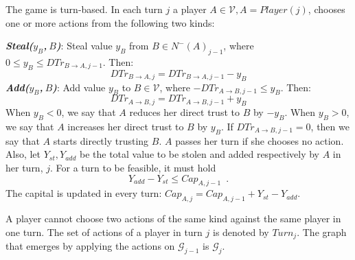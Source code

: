 \begin{definition}[Turns]
  The game is turn-based. In each turn $j$ a player $A \in \mathcal{V}, A =
  Player\left(j\right)$, chooses one or more actions from the following two kinds:

  \noindent \textit{\textbf{Steal($y_B$,$\:B$)}}: Steal value $y_B$ from $B \in N^{-}\left(A\right)_{j-1}$, where
  $0 \leq y_B \leq DTr_{B \rightarrow A, j-1}$. Then:
  \begin{equation*}
     DTr_{B \rightarrow A, j} = DTr_{B \rightarrow A, j-1} - y_B
  \end{equation*}
  \noindent \textit{\textbf{Add($y_B$,$\:B$)}}:
  Add value $y_B$ to $B \in \mathcal{V}$, where $-DTr_{A \rightarrow B, j-1} \leq y_B$. Then:
  \begin{equation*}
     DTr_{A \rightarrow B, j} = DTr_{A \rightarrow B, j-1} + y_B
  \end{equation*}
  When $y_B < 0$, we say that $A$ reduces her direct trust to $B$ by $-y_B$. When $y_B > 0$, we say that $A$ increases her
  direct trust to $B$ by $y_B$. If $DTr_{A \rightarrow B, j-1} = 0$, then we say that $A$ starts directly trusting $B$.
  $A$ passes her turn if she chooses no action. Also, let $Y_{st}, Y_{add}$ be the
  total value to be stolen and added respectively by $A$ in her turn, $j$. For a turn to be feasible, it must hold
  \begin{equation}
     Y_{add} - Y_{st} \leq Cap_{A, j-1} \enspace.
  \end{equation}
  The capital is updated in every turn: $Cap_{A, j} = Cap_{A, j-1} + Y_{st} - Y_{add}$.

  A player cannot choose two actions of the same kind against the same player in one turn.
  The set of actions of a player in turn $j$ is denoted by $Turn_j$. The graph that emerges by applying
  the actions on $\mathcal{G}_{j-1}$ is $\mathcal{G}_j$.
\end{definition}
